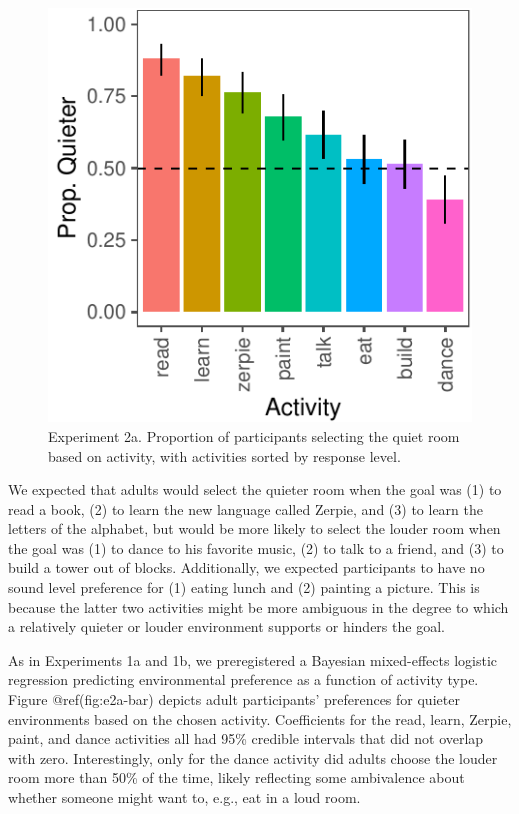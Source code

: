 \documentclass[10pt, letterpaper]{article}
\newenvironment{CodeChunk}{}{}
\begin{document}
\begin{CodeChunk}
\begin{figure}[t]

{\centering \includegraphics{figs/e2a-bar-1} 

}

\caption[Experiment 2a]{Experiment 2a. Proportion of participants selecting the quiet room based on activity, with activities sorted by response level.}\label{fig:e2a-bar}
\end{figure}
\end{CodeChunk}

We expected that adults would select the quieter room when the goal was
(1) to read a book, (2) to learn the new language called Zerpie, and (3)
to learn the letters of the alphabet, but would be more likely to select
the louder room when the goal was (1) to dance to his favorite music,
(2) to talk to a friend, and (3) to build a tower out of blocks.
Additionally, we expected participants to have no sound level preference
for (1) eating lunch and (2) painting a picture. This is because the
latter two activities might be more ambiguous in the degree to which a
relatively quieter or louder environment supports or hinders the goal.

As in Experiments 1a and 1b, we preregistered a Bayesian mixed-effects
logistic regression predicting environmental preference as a function of
activity type. Figure @ref(fig:e2a-bar) depicts adult participants'
preferences for quieter environments based on the chosen activity.
Coefficients for the read, learn, Zerpie, paint, and dance activities
all had 95\% credible intervals that did not overlap with zero.
Interestingly, only for the dance activity did adults choose the louder
room more than 50\% of the time, likely reflecting some ambivalence
about whether someone might want to, e.g., eat in a loud room.
\end{document}
